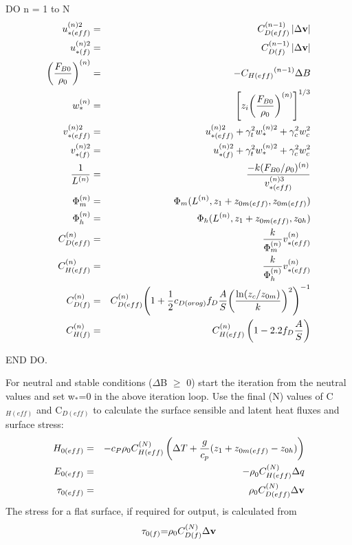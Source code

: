 \documentclass{UMDP_article}
\begin{document}
DO n = 1 to N
\begin{eqnarray}
  u_{\ast (eff)}^{(n)2}&=& C_{D(eff)}^{(n-1)} \left| {\Delta {{\rm {\bf v}}}} \right|
  \label{(2.2.15} \\
  u_{\ast (f)}^{(n)2}&=& C_{D(f)}^{(n-1)} \left| {\Delta {{\rm {\bf v}}}} \right|
  \label{(2.2.16} \\
  {\left( {\frac{ F_{B0} }{ \rho _0 }} \right)}^{(n)}&=&- { C_{H(eff)} }^{(n-1)} \Delta B
  \label{(2.2.17} \\
  w_\ast ^{(n)}&=& {\left[ {  z_i  {\left( {\frac{ F_{B0} }{ \rho _0 }} \right)}^{(n)} } \right]}^{ 1/3} 
  \label{(2.2.18} \\
  v_{\ast (eff)}^{(n)2}&=& u_{\ast (eff)}^{(n)2} +  \gamma _t^2  w_\ast ^{(n)2} +  \gamma _c^2  w_c^2 
  \label{(2.2.19} \\
  v_{\ast (f)}^{(n)2}&= &u_{\ast (f)}^{(n)2} +  \gamma _t^2  w_\ast ^{(n)2} +  \gamma _c^2  w_c^2 
  \label{(2.2.20} \\
  \frac{1}{ L^{(n)} }&=&\frac{-k( F_{B0} / \rho _0  )^{(n)} }{ v_{\ast (eff)}^{(n)3} }
  \label{(2.2.21} \\
  \Phi _m^{(n)}&=& \Phi _m ( L^{(n)} ,  z_1 +  z_{0m(eff)} ,  z_{0m(eff)} )
  \label{(2.2.22} \\
  \Phi _h^{(n)}&=& \Phi _h ( L^{(n)} ,  z_1 +  z_{0m(eff)} ,  z_{0h} )
  \label{(2.2.23} \\
  C_{D(eff)}^{(n)}&=&\frac{k}{ \Phi _m^{(n)} }  v_{\ast (eff)}^{(n)} 
  \label{(2.2.24} \\
  C_{H(eff)}^{(n)}&=&\frac{k}{ \Phi _h^{(n)} }  v_{\ast (eff)}^{(n)} 
  \label{(2.2.25} \\
  C_{D(f)}^{(n)}&=& C_{D(eff)}^{(n)}  {\left( {1 + \frac{1}{2} c_{D(orog)}  f_D \frac{A}{S}  {\left( {\frac{\ln ( z_c /  z_{0m} )}{k}} \right)}^2 } \right)}^{-1}
  \label{(2.2.26} \\
  C_{H(f)}^{(n)}&=& C_{H(eff)}^{(n)} \left( {1 - 2.2  f_D \frac{A}{S}} \right)
  \label{(2.2.27}
\end{eqnarray}

END DO.

For neutral and stable conditions ($\Delta $B $\ge $ 0) start the
iteration from the neutral values and set w$_{\ast }$=0 in the above
iteration loop.  Use the final (N) values of C$_{H(eff)}$ and
C$_{D(eff)}$ to calculate the surface sensible and latent heat fluxes
and surface stress:
\begin{eqnarray}
  H_{0(eff)}&=&- c_P  \rho _0  C_{H(eff)}^{(N)} \left( {\Delta T + \frac{g}{c_p }( z_1 +  z_{0m(eff)} - z_{0h} )} \right)
  \label{2.2.28} \\
  E_{0(eff)}&=& {-\rho }_0  C_{H(eff)}^{(N)} \Delta q
  \label{2.2.29} \\
  {\rm {\bf \tau }}_{{0(eff)}} &=& \rho _0  C_{D(eff)}^{(N)} \Delta {\rm {\bf v}}
  \label{2.2.30}
\end{eqnarray}
The stress for a flat surface, if required for output, is calculated from
\begin{equation}
  {\rm {\bf \tau }}_{{0(f)}} { = } \rho _0
  C_{D(f)}^{(N)} \Delta {\rm {\bf v}}
  \label{2.2.31}
\end{equation}
\end{document}
